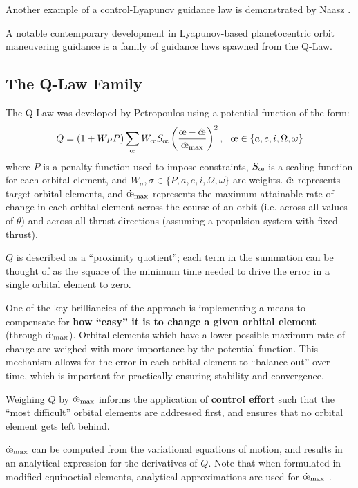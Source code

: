 Another example of a control-Lyapunov guidance law is demonstrated by Naasz \cite{naasz2002classical}.

A notable contemporary development in Lyapunov-based planetocentric orbit maneuvering guidance is a family of guidance laws spawned from the Q-Law.

\subsection{The Q-Law Family}
The Q-Law was developed by Petropoulos \cite{petropoulos2004low} using a potential function of the form:
\begin{equation}
  Q = (1 + W_P P) \sum_{\moe} W_\moe S_\moe \left(\frac{\moe - \hat{\moe}}{\dot{\moe}_{\max}} \right)^2, \ \  \moe \in \{a, e, i, \Omega, \omega\}
  \label{eq:q_law_petropulos}
\end{equation}
where \(P\) is a penalty function used to impose constraints, \(S_\moe\) is a scaling function for each orbital element, and \(W_\sigma, \sigma \in \{P, a, e, i, \Omega, \omega\}\) are weights. \(\hat{\moe}\) represents target orbital elements, and \(\dot{\moe}_{\max}\) represents the maximum attainable rate of change in each orbital element across the course of an orbit (i.e. across all values of \(\theta\)) and across all thrust directions (assuming a propulsion system with fixed thrust).

\(Q\) is described as a ``proximity quotient''; each term in the summation can be thought of as the square of the minimum time needed to drive the error in a single orbital element to zero.

One of the key brilliancies of the approach is implementing a means to compensate for \textbf{how ``easy'' it is to change a given orbital element} (through \(\dot{\moe}_{\max}\)). Orbital elements which have a lower possible maximum rate of change are weighed with more importance by the potential function. This mechanism allows for the error in each orbital element to ``balance out'' over time, which is important for practically ensuring stability and convergence.

Weighing \(Q\) by \(\dot{\moe}_{\max}\) informs the application of \textbf{control effort} such that the ``most difficult'' orbital elements are addressed first, and ensures that no orbital element gets left behind.

\(\dot{\moe}_{\max}\) can be computed from the variational equations of motion, and results in an analytical expression for the derivatives of \(Q\). Note that when formulated in modified equinoctial elements, analytical approximations are used for \(\dot{\moe}_{\max}\) \cite{vargaperez2016, sanjeev2023}.


